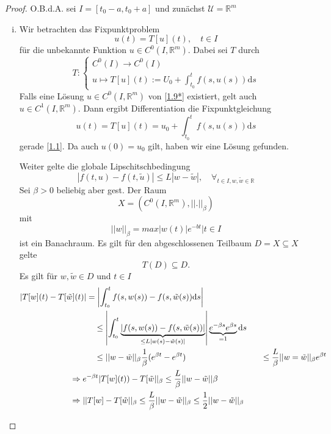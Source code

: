 \documentclass[11pt]{book}
\newcommand{\dd}{\mathrm{d}}
\newcommand{\RR}{\mathbb{R}}
\newcommand{\UU}{\mathcal{U}}
\newcommand{\myTag}[2][]{\tag{#2}\label{#1#2}}
\theoremstyle{break}
\theoremstyle{myStyle}
\begin{document}
\begin{proof}
  O.B.d.A. sei \( I = [t_0-a,t_0+a] \) und zun\"achst \(\UU = \RR^m \)
  \begin{enumerate}[(i)]
    \item Wir betrachten das Fixpunktproblem \[ u(t) = T[u](t), \quad t\in I
      \myTag[1.9]{*} \] f\"ur die unbekannte Funktion \( u \in C^0(I,\RR^m) \).
      Dabei sei \( T \) durch \[ T : \left\{ \begin{array}{lr} C^0 (I)
            \rightarrow C^0(I) \\ u \mapsto T[u](t) := U_0 +
        \int_{t_0}^t f(s,u(s)) \dd s \end{array} \right. \] Falls eine L\"osung \( u
        \in C^0(I, \RR^m) \) von \eqref{1.9*} existiert, gelt auch \( u \in
        C^1(I,\RR^m) \). Dann ergibt Differentiation die Fixpunktgleichung \[
        u(t) = T[u](t) = u_0 + \int_{t_0}^t f(s,u(s)) \dd s\] gerade
        \eqref{1.1}. Da auch \( u(0) = u_0 \) gilt, haben wir eine L\"osung
        gefunden.

        Weiter gelte die globale Lipschitschbedingung \[ |f(t,u) - f(t, \tilde{u}
          )| \leq L | w - \tilde{w} |, \quad \forall_{t\in I, w,\tilde{w} \in \RR}
          \myTag[1.9]{**} \]
          Sei \( \beta > 0 \) beliebig aber gest. Der Raum \[
            X= (C^0(I,\RR^m),||.||_\beta ) \]
          mit \[
            ||w||_\beta = max{|w(t)| e^{-bt} | t\in I } \]
          ist ein Banachraum. Es gilt f\"ur den abgeschlossenen Teilbaum
          \( D=X\subseteq X \) gelte \[
            T(D) \subseteq D. \]
          Es gilt f\"ur  \( w, \tilde{w} \in D \) und \( t \in I \) \begin{align*}
            \left| T[w](t)-T[\tilde{w}](t) \right| 
            &= \left| \int_{t_0}^t f(s,w(s))-f(s,\tilde{w}(s)) \dd s \right| \\
            & \quad \leq \left| \int_{t_0}^t \underbrace{| f(s,w(s))
              -f(s,\tilde{w}(s))|}_{\leq L |w(s)-\tilde{w}(s)|} \right|
              \underbrace{e^{-\beta s} e^{\beta s}}_{ = 1} \dd s \\
              & \quad \leq || w - \tilde{w}||_\beta \frac{1}{\beta}(e^{\beta
              t}-e^{\beta t})
              & \quad \leq \frac{L}{\beta} ||w = \tilde{w}||_\beta e^{\beta t} \\
              \MoveEqLeft \Rightarrow e^{-\beta t}|T[w](t)) - T[\tilde{w}||_\beta
                \leq \frac{L}{\beta}||w-\tilde{w}||\beta \\
              \MoveEqLeft \Rightarrow ||T[w]-T[\tilde{w}||_\beta 
                \leq \frac{L}{\beta}||w-\tilde{w}||_\beta \leq
                \frac{1}{2}||w-\tilde{w}||_\beta
        \end{align*}


\end{enumerate}
\end{proof}
\end{document}
